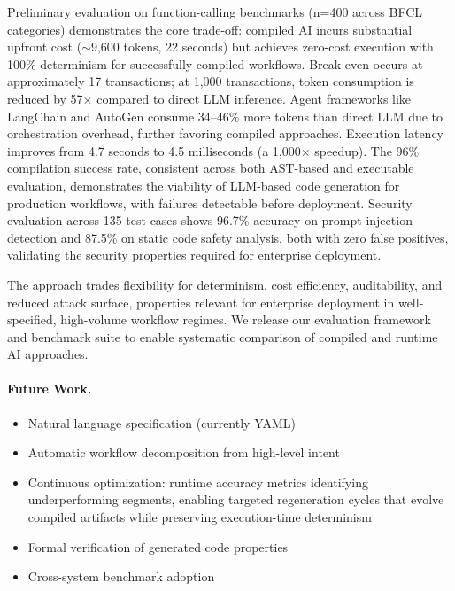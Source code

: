 \documentclass[11pt]{article}
\begin{document}
Preliminary evaluation on function-calling benchmarks (n=400 across BFCL categories) demonstrates the core trade-off: compiled AI incurs substantial upfront cost ($\sim$9,600 tokens, 22 seconds) but achieves zero-cost execution with 100\% determinism for successfully compiled workflows. Break-even occurs at approximately 17 transactions; at 1,000 transactions, token consumption is reduced by 57$\times$ compared to direct LLM inference. Agent frameworks like LangChain and AutoGen consume 34--46\% more tokens than direct LLM due to orchestration overhead, further favoring compiled approaches. Execution latency improves from 4.7 seconds to 4.5 milliseconds (a 1,000$\times$ speedup). The 96\% compilation success rate, consistent across both AST-based and executable evaluation, demonstrates the viability of LLM-based code generation for production workflows, with failures detectable before deployment. Security evaluation across 135 test cases shows 96.7\% accuracy on prompt injection detection and 87.5\% on static code safety analysis, both with zero false positives, validating the security properties required for enterprise deployment.

The approach trades flexibility for determinism, cost efficiency, auditability, and reduced attack surface, properties relevant for enterprise deployment in well-specified, high-volume workflow regimes. We release our evaluation framework and benchmark suite to enable systematic comparison of compiled and runtime AI approaches.

\paragraph{Future Work.}
\begin{itemize}
    \item Natural language specification (currently YAML)
    \item Automatic workflow decomposition from high-level intent
    \item Continuous optimization: runtime accuracy metrics identifying underperforming segments, enabling targeted regeneration cycles that evolve compiled artifacts while preserving execution-time determinism
    \item Formal verification of generated code properties
    \item Cross-system benchmark adoption
\end{itemize}

\end{document}

